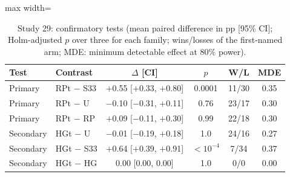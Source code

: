 \begin{table}[t]
\caption{Study 29: confirmatory tests (mean paired difference in pp [95\% CI]; Holm-adjusted $p$ over three for each family; wins/losses of the first-named arm; MDE: minimum detectable effect at 80\% power).}\label{tab:s29f}
\centering
\small
\begin{adjustbox}{max width=\linewidth}
\begin{tabular}{llcccc}
\toprule
Test & Contrast & $\Delta$ [CI] & $p$ & W/L & MDE \\
\midrule
Primary & RPt $-$ S33 & $+$0.55 [$+$0.33, $+$0.80] & 0.0001 & 11/30 & 0.35 \\
Primary & RPt $-$ U & $-$0.10 [$-$0.31, $+$0.11] & 0.76 & 23/17 & 0.30 \\
Primary & RPt $-$ RP & $+$0.09 [$-$0.11, $+$0.30] & 0.99 & 22/18 & 0.30 \\
Secondary & HGt $-$ U & $-$0.01 [$-$0.19, $+$0.18] & 1.0 & 24/16 & 0.27 \\
Secondary & HGt $-$ S33 & $+$0.64 [$+$0.39, $+$0.91] & \ensuremath{<10^{-4}} & 7/34 & 0.37 \\
Secondary & HGt $-$ HG & 0.00 [0.00, 0.00] & 1.0 & 0/0 & 0.00 \\
\bottomrule
\end{tabular}
\end{adjustbox}
\end{table}
